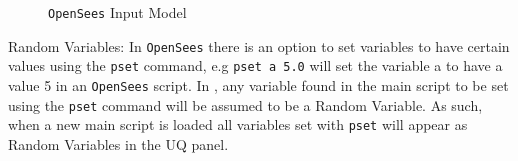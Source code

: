 \begin{figure}[!htbp]
  \caption{\texttt{OpenSees} Input Model}
  \label{fig:figure3}
\end{figure}

Random Variables: In \texttt{OpenSees} there is an option to set
variables to have certain values using the \texttt{pset} command, e.g
\texttt{pset a 5.0} will set the variable a to have a value 5 in an
\texttt{OpenSees} script. In \texttt{\getsoftwarename{}}, any variable
found in the main script to be set using the \texttt{pset} command
will be assumed to be a Random Variable. As such, when a new main
script is loaded all variables set with \texttt{pset} will appear as
Random Variables in the UQ panel.

